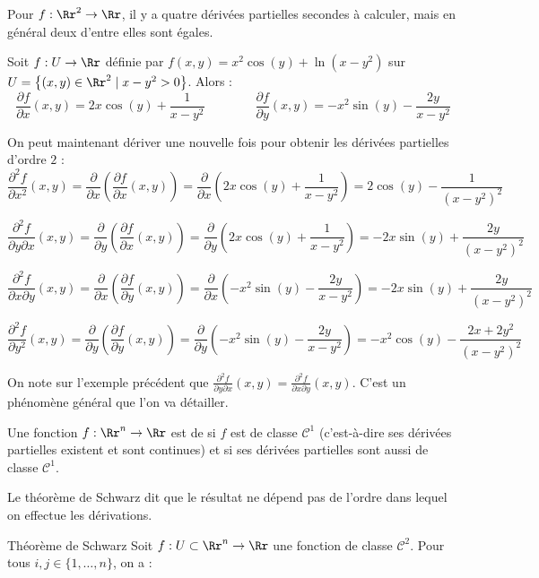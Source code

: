 Pour $f : \Rr^2 \to \Rr$, il y a quatre dérivées partielles secondes à calculer, mais en général deux d'entre elles sont égales.

\begin{exemple}{}{}
Soit $f : U \to \Rr$ définie par $f(x,y) = x^2\cos(y) + \ln(x-y^2)$ sur $U = \big\{ (x,y) \in \Rr^2 \mid x-y^2>0 \big\}$.
Alors :
$$\frac{\partial f}{\partial x}(x,y) = 2x\cos(y) + \frac{1}{x-y^2}
\qquad\qquad
\frac{\partial f}{\partial y}(x,y) = -x^2\sin(y) - \frac{2y}{x-y^2}$$

On peut maintenant dériver une nouvelle fois pour obtenir les dérivées partielles d'ordre $2$ :
$$\frac{\partial ^2 f}{\partial x^2}(x,y) 
= \frac{\partial}{\partial x}\left(\frac{\partial f}{\partial x}(x,y)\right)
= \frac{\partial}{\partial x}\left(2x\cos(y) + \frac{1}{x-y^2}\right)
= 2\cos(y) - \frac{1}{(x-y^2)^2}$$

$$\frac{\partial ^2 f}{\partial y\partial x}(x,y) 
= \frac{\partial}{\partial y}\left(\frac{\partial f}{\partial x}(x,y)\right)
= \frac{\partial}{\partial y}\left(2x\cos(y) + \frac{1}{x-y^2}\right)
= \boxed{-2x\sin(y) + \frac{2y}{(x-y^2)^2}}$$

$$\frac{\partial ^2 f}{\partial x\partial y}(x,y) 
= \frac{\partial}{\partial x}\left(\frac{\partial f}{\partial y}(x,y)\right)
= \frac{\partial}{\partial x}\left(-x^2\sin(y) - \frac{2y}{x-y^2}\right)
= \boxed{-2x\sin(y) + \frac{2y}{(x-y^2)^2}}$$

$$\frac{\partial ^2 f}{\partial y^2}(x,y) 
= \frac{\partial}{\partial y}\left(\frac{\partial f}{\partial y}(x,y)\right)
= \frac{\partial}{\partial y}\left(-x^2\sin(y) - \frac{2y}{x-y^2}\right)
= -x^2\cos(y) - \frac{2x+2y^2}{(x-y^2)^2}$$


\end{exemple}

On note sur l'exemple précédent que $\frac{\partial ^2 f}{\partial y\partial x}(x,y) = \frac{\partial ^2 f}{\partial x\partial y}(x,y)$. C'est un phénomène général que l'on va détailler.


\begin{definition}{}{}
    Une fonction $f : \Rr^n \to \Rr$ est de  si $f$ est de classe $\mathcal{C}^1$ (c'est-à-dire ses dérivées partielles existent et sont continues) et si ses dérivées partielles sont aussi de classe $\mathcal{C}^1$.
\end{definition}

Le théorème de Schwarz dit que le résultat ne dépend pas de l'ordre dans lequel on effectue les dérivations.
\begin{theoreme}{Théorème de Schwarz}{}
Soit $f:U\subset \Rr^n\to \Rr$ une fonction de classe $\mathcal{C}^2$. 
Pour tous $i,j  \in \{1,\dots ,n\}$, on a :
\end{theoreme}

